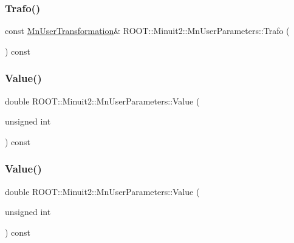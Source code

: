 \subsubsection{\texorpdfstring{Trafo()}{Trafo()}\hspace{0.1cm}{\footnotesize\ttfamily [3/3]}}
{\footnotesize\ttfamily const \mbox{\hyperlink{classROOT_1_1Minuit2_1_1MnUserTransformation}{Mn\+User\+Transformation}}\& R\+O\+O\+T\+::\+Minuit2\+::\+Mn\+User\+Parameters\+::\+Trafo (\begin{DoxyParamCaption}{ }\end{DoxyParamCaption}) const\hspace{0.3cm}{\ttfamily [inline]}}

\mbox{\label{classROOT_1_1Minuit2_1_1MnUserParameters_a5084b0d1312ddb87609ff726a11fd7f6}} 
\subsubsection{\texorpdfstring{Value()}{Value()}\hspace{0.1cm}{\footnotesize\ttfamily [1/6]}}
{\footnotesize\ttfamily double R\+O\+O\+T\+::\+Minuit2\+::\+Mn\+User\+Parameters\+::\+Value (\begin{DoxyParamCaption}\item[{unsigned int}]{ }\end{DoxyParamCaption}) const}

\mbox{\label{classROOT_1_1Minuit2_1_1MnUserParameters_a5084b0d1312ddb87609ff726a11fd7f6}} 
\subsubsection{\texorpdfstring{Value()}{Value()}\hspace{0.1cm}{\footnotesize\ttfamily [2/6]}}
{\footnotesize\ttfamily double R\+O\+O\+T\+::\+Minuit2\+::\+Mn\+User\+Parameters\+::\+Value (\begin{DoxyParamCaption}\item[{unsigned int}]{ }\end{DoxyParamCaption}) const}

